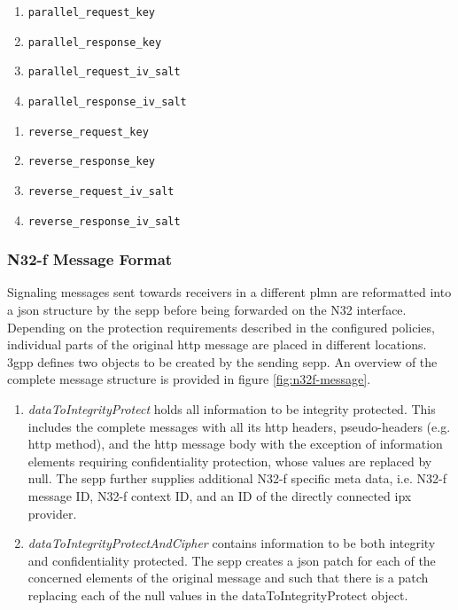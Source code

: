 \begin{minipage}[l]{0.5\textwidth}
    \begin{enumerate}[label=--]
        \item \texttt{parallel\_request\_key}
        \item \texttt{parallel\_response\_key}
        \item \texttt{parallel\_request\_iv\_salt}
        \item \texttt{parallel\_response\_iv\_salt}
    \end{enumerate}
\end{minipage}%
\begin{minipage}[r]{0.5\textwidth}
    \begin{enumerate}[label=--]
        \item \texttt{reverse\_request\_key}
        \item \texttt{reverse\_response\_key}
        \item \texttt{reverse\_request\_iv\_salt}
        \item \texttt{reverse\_response\_iv\_salt}
    \end{enumerate}
\end{minipage}

\subsubsection{N32-f Message Format}

Signaling messages sent towards receivers in a different \gls{plmn} are reformatted into a \gls{json} structure by the \gls{sepp} before being forwarded on the N32 interface.
Depending on the protection requirements described in the configured policies, individual parts of the original \gls{http} message are placed in different locations.
\gls{3gpp} defines two objects to be created by the sending \gls{sepp}.
An overview of the complete message structure is provided in figure \ref{fig:n32f-message}.

\begin{enumerate}[label=--]
    \item \textit{dataToIntegrityProtect} holds all information to be integrity protected.
    This includes the complete messages with all its \gls{http} headers, pseudo-headers (e.g. \gls{http} method), and the \gls{http} message body with the exception of information elements requiring confidentiality protection, whose values are replaced by null.
    The \gls{sepp} further supplies additional N32-f specific meta data, i.e. N32-f message ID, N32-f context ID, and an ID of the directly connected \gls{ipx} provider.

    \item \textit{dataToIntegrityProtectAndCipher} contains information to be both integrity and confidentiality protected.
    The \gls{sepp} creates a \gls{json} patch for each of the concerned elements of the original message and such that there is a patch replacing each of the null values in the dataToIntegrityProtect object.
\end{enumerate}


